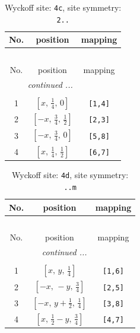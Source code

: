\documentclass[fleqn,8pt]{jsarticle}
\begin{document}
\renewcommand{\arraystretch}{1.2}
\begin{longtable}{ccc}
\caption{Wyckoff site: {\tt 4c}, site symmetry: {\tt 2..}}
 \\
 \hline \hline
No. & position & mapping \\ \hline \endfirsthead

\multicolumn{2}{l}{\tablename\ \thetable{}} \\
 \hline \hline
No. & position & mapping \\ \hline \endhead

 \hline \hline
\multicolumn{2}{r}{\footnotesize\it continued ...} \\ \endfoot

 \hline \hline
\multicolumn{2}{r}{} \\ \endlastfoot

1 & $\left[ x,\, \frac{1}{4},\, 0 \right]$ & {\tt [1,4]} \\ \hline
2 & $\left[ - x,\, \frac{3}{4},\, \frac{1}{2} \right]$ & {\tt [2,3]} \\ \hline
3 & $\left[ - x,\, \frac{3}{4},\, 0 \right]$ & {\tt [5,8]} \\ \hline
4 & $\left[ x,\, \frac{1}{4},\, \frac{1}{2} \right]$ & {\tt [6,7]} \\
\end{longtable}
\renewcommand{\arraystretch}{1.2}
\begin{longtable}{ccc}
\caption{Wyckoff site: {\tt 4d}, site symmetry: {\tt ..m}}
 \\
 \hline \hline
No. & position & mapping \\ \hline \endfirsthead

\multicolumn{2}{l}{\tablename\ \thetable{}} \\
 \hline \hline
No. & position & mapping \\ \hline \endhead

 \hline \hline
\multicolumn{2}{r}{\footnotesize\it continued ...} \\ \endfoot

 \hline \hline
\multicolumn{2}{r}{} \\ \endlastfoot

1 & $\left[ x,\, y,\, \frac{1}{4} \right]$ & {\tt [1,6]} \\ \hline
2 & $\left[ - x,\, - y,\, \frac{3}{4} \right]$ & {\tt [2,5]} \\ \hline
3 & $\left[ - x,\, y + \frac{1}{2},\, \frac{1}{4} \right]$ & {\tt [3,8]} \\ \hline
4 & $\left[ x,\, \frac{1}{2} - y,\, \frac{3}{4} \right]$ & {\tt [4,7]} \\
\end{longtable}
\end{document}
